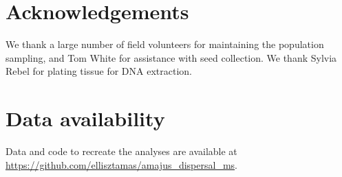 \documentclass[10pt, a4paper, twocolumn]{article} %
\begin{document}
\section{Acknowledgements}

We thank a large number of field volunteers for maintaining the population sampling, and Tom White for assistance with seed collection. We thank Sylvia Rebel for plating tissue for DNA extraction.

\section{Data availability}

Data and code to recreate the analyses are available at \url{https://github.com/ellisztamas/amajus_dispersal_ms}.


\printbibliography[title={Bibliography}] %

\end{document}
